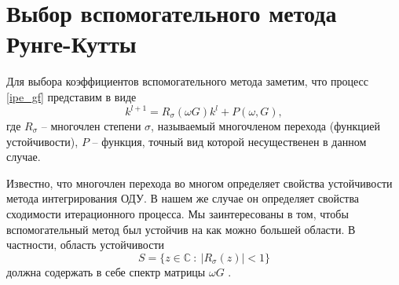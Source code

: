 \documentclass[a4paper, 14pt]{extreport} %
\begin{document}
\section{Выбор вспомогательного метода Рунге-Кутты}

Для выбора коэффициентов вспомогательного метода заметим, что процесс \eqref{ipe_gf} представим в виде
\begin{equation}
\label{ipe_spektr_form}
k^{l+1} = R_\sigma(\omega G)k^l+P(\omega, G),
\end{equation}
где $R_\sigma$ -- многочлен степени $\sigma$, называемый многочленом перехода (функцией устойчивости),  $P$ -- функция, точный вид которой несущественен в данном случае.

Известно, что многочлен перехода во многом определяет свойства
устойчивости метода интегрирования ОДУ. В нашем же случае он
определяет свойства сходимости итерационного процесса. Мы
заинтересованы в том, чтобы вспомогательный метод был устойчив на
как можно большей области. В частности, область устойчивости
$$ S = \{z \in \mathbb{C}\ :\  |R_{\sigma}(z)|<1  \}$$
должна содержать в себе  спектр матрицы $\omega G$ \cite{Faleichik_Bondar_Kyiv}.%
\end{document}

